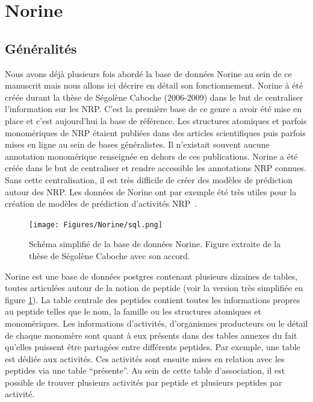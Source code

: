 \section{Norine}
\label{nor_3}

\subsection{Généralités}

Nous avons déjà plusieurs fois abordé la base de données Norine au sein de ce manuscrit mais nous allons ici décrire en détail son fonctionnement.
Norine à été créée durant la thèse de Ségolène Caboche (2006-2009) dans le but de centraliser l'information sur les NRP.
C'est la première base de ce genre a avoir été mise en place et c'est aujourd'hui la base de référence.
Les structures atomiques et parfois monomériques de NRP étaient publiées dans des articles scientifiques puis parfois mises en ligne au sein de bases généralistes.
Il n'existait souvent aucune annotation monomérique renseignée en dehors de ces publications.
Norine a été créée dans le but de centraliser et rendre accessible les annotations NRP connues.
Sans cette centralisation, il est très difficile de créer des modèles de prédiction autour des NRP.
Les données de Norine ont par exemple été très utiles pour la création de modèles de prédiction d'activités NRP~\cite{abdo_prediction_2014,abdo_new_2012}.

\begin{figure}[h!]
  \begin{center}
    \texttt{[image: Figures/Norine/sql.png]}
    \caption{\label{sql}Schéma simplifié de la base de données Norine.
    Figure extraite de la thèse de Ségolène Caboche avec son accord.}
  \end{center}
\end{figure}

Norine est une base de données postgres contenant plusieurs dizaines de tables, toutes articulées autour de la notion de peptide (voir la version très simplifiée en figure \ref{sql}).
La table centrale des peptides contient toutes les informations propres au peptide telles que le nom, la famille ou les structures atomiques et monomériques.
Les informations d'activités, d'organismes producteurs ou le détail de chaque monomère sont quant à eux présents dans des tables annexes du fait qu'elles puissent être partagées entre différents peptides.
Par exemple, une table est dédiée aux activités.
Ces activités sont ensuite mises en relation avec les peptides via une table ``présente''.
Au sein de cette table d'association, il est possible de trouver plusieurs activités par peptide et plusieurs peptides par activité.

